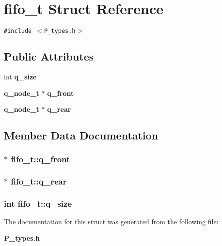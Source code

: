 \section{fifo\_\-t  Struct Reference}
\label{structfifo__t}
{\tt \#include $<$P\_\-types.h$>$}

\subsection*{Public Attributes}
\begin{CompactItemize}
\item 
int {\bf q\_\-size}
\item 
{\bf q\_\-node\_\-t} $\ast$ {\bf q\_\-front}
\item 
{\bf q\_\-node\_\-t} $\ast$ {\bf q\_\-rear}
\end{CompactItemize}


\subsection{Member Data Documentation}
\subsubsection{$\ast$ fifo\_\-t::q\_\-front}\label{structfifo__t_m1}


\subsubsection{$\ast$ fifo\_\-t::q\_\-rear}\label{structfifo__t_m2}


\subsubsection{\setlength{\rightskip}{0pt plus 5cm}int fifo\_\-t::q\_\-size}\label{structfifo__t_m0}




The documentation for this struct was generated from the following file:\begin{CompactItemize}
\item 
{\bf P\_\-types.h}\end{CompactItemize}
